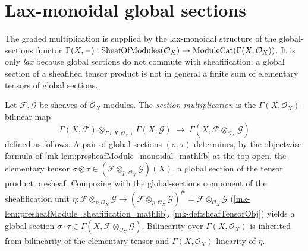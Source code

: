 \section{Lax-monoidal global sections}
\label{mk-sec:sgr_lax_sections}

The graded multiplication is supplied by the lax-monoidal structure of the
global-sections functor \(\Gamma(X, -) : \mathrm{SheafOfModules}(\mathcal{O}_X) \to
\mathrm{ModuleCat}(\Gamma(X, \mathcal{O}_X))\). It is only \emph{lax} because
global sections do not commute with sheafification: a global section of a
sheafified tensor product is not in general a finite sum of elementary tensors of
global sections.

\begin{definition}\label{mk-def:sectionMul}
  \leanok

  Let \(\mathcal{F}, \mathcal{G}\) be sheaves of \(\mathcal{O}_X\)-modules. The
  \emph{section multiplication} is the \(\Gamma(X,\mathcal{O}_X)\)-bilinear map
  \[
    \Gamma(X, \mathcal{F}) \otimes_{\Gamma(X,\mathcal{O}_X)}
      \Gamma(X, \mathcal{G})
    \;\longrightarrow\;
    \Gamma(X, \mathcal{F} \otimes_{\mathcal{O}_X} \mathcal{G})
  \]
  defined as follows. A pair of global sections \((\sigma, \tau)\) determines,
  by the objectwise formula of \ref{mk-lem:presheafModule_monoidal_mathlib} at the
  top open, the elementary tensor \(\sigma \otimes \tau \in
  (\mathcal{F} \otimes_{p,\mathcal{O}_X} \mathcal{G})(X)\), a global section of
  the tensor product presheaf. Composing with the global-sections component of
  the sheafification unit
  \(\eta : \mathcal{F} \otimes_{p,\mathcal{O}_X} \mathcal{G} \to
  (\mathcal{F} \otimes_{p,\mathcal{O}_X} \mathcal{G})^{\#} =
  \mathcal{F} \otimes_{\mathcal{O}_X} \mathcal{G}\)
  (\ref{mk-lem:presheafModule_sheafification_mathlib},
  \ref{mk-def:sheafTensorObj}) yields a global section
  \(\sigma \cdot \tau \in
  \Gamma(X, \mathcal{F} \otimes_{\mathcal{O}_X} \mathcal{G})\). Bilinearity over
  \(\Gamma(X,\mathcal{O}_X)\) is inherited from bilinearity of the elementary
  tensor and \(\Gamma(X,\mathcal{O}_X)\)-linearity of \(\eta\).
\end{definition}

